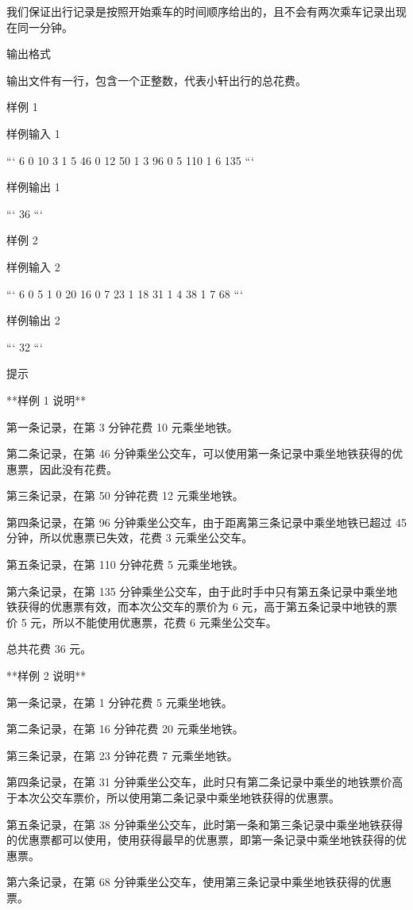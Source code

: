 \documentclass[12pt,twiside,a4paper]{ctexbook}
\numberwithin{chapter}{part}
\begin{document}
我们保证出行记录是按照开始乘车的时间顺序给出的，且不会有两次乘车记录出现在同一分钟。

 输出格式

输出文件有一行，包含一个正整数，代表小轩出行的总花费。

 样例 1

 样例输入 1

```
6
0 10 3
1 5 46
0 12 50
1 3 96
0 5 110
1 6 135
```

 样例输出 1

```
36
```

 样例 2

 样例输入 2

```
6
0 5 1
0 20 16
0 7 23
1 18 31
1 4 38
1 7 68
```

 样例输出 2

```
32
```

 提示

**样例 1 说明**

第一条记录，在第 3 分钟花费 10 元乘坐地铁。

第二条记录，在第 46 分钟乘坐公交车，可以使用第一条记录中乘坐地铁获得的优惠票，因此没有花费。

第三条记录，在第 50 分钟花费 12 元乘坐地铁。

第四条记录，在第 96 分钟乘坐公交车，由于距离第三条记录中乘坐地铁已超过 45 分钟，所以优惠票已失效，花费 3 元乘坐公交车。

第五条记录，在第 110 分钟花费 5 元乘坐地铁。

第六条记录，在第 135 分钟乘坐公交车，由于此时手中只有第五条记录中乘坐地铁获得的优惠票有效，而本次公交车的票价为 6 元，高于第五条记录中地铁的票价 5 元，所以不能使用优惠票，花费 6 元乘坐公交车。

总共花费 36 元。 

**样例 2 说明**

第一条记录，在第 1 分钟花费 5 元乘坐地铁。

第二条记录，在第 16 分钟花费 20 元乘坐地铁。

第三条记录，在第 23 分钟花费 7 元乘坐地铁。

第四条记录，在第 31 分钟乘坐公交车，此时只有第二条记录中乘坐的地铁票价高于本次公交车票价，所以使用第二条记录中乘坐地铁获得的优惠票。

第五条记录，在第 38 分钟乘坐公交车，此时第一条和第三条记录中乘坐地铁获得的优惠票都可以使用，使用获得最早的优惠票，即第一条记录中乘坐地铁获得的优惠票。

第六条记录，在第 68 分钟乘坐公交车，使用第三条记录中乘坐地铁获得的优惠票。
\end{document}
